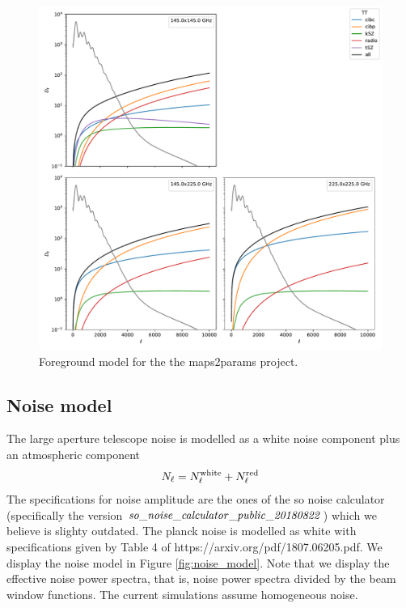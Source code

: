 \documentclass[a4paper, 11pt]{article}
\def\ba{\begin{eqnarray}}
\def\ea{\end{eqnarray}}
\begin{document}
\begin{figure}
  \centering
  \includegraphics[width=1 \textwidth]{foregrounds.pdf}
  \caption{Foreground model for the the maps2params project.}
  \label{fig:fg_model}
\end{figure}

\subsection{Noise model}

The large aperture telescope noise is modelled as a white noise component plus an atmospheric  component
\ba
N_{\ell} = N^{\rm white}_{\ell} + N^{\rm red}_{\ell}
\ea
The specifications for noise amplitude are the ones of the so noise calculator (specifically the version ${\it so\_noise\_calculator\_public\_20180822}$) which we believe is slighty outdated. The planck noise is modelled as white with specifications given by Table 4 of https://arxiv.org/pdf/1807.06205.pdf.
We display the noise model in Figure \ref{fig:noise_model}. Note that we display the effective noise power spectra, that is,  noise power spectra divided by the beam window functions. The current simulations assume homogeneous noise.
\end{document}

